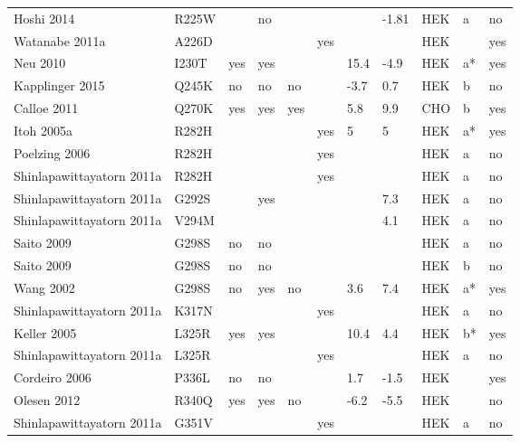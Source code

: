 \begin{tiny}
\begin{longtable}{p{4cm}|l|llll|ll|lll}
Hoshi 2014\cite{Hoshi2014MutationDB} & R225W &  & no &  &  &  & -1.81 & HEK & a & no \\
Watanabe 2011a\cite{Watanabe2011aMutationDB} & A226D &  &  &  & yes &  &  & HEK &  & yes \\
Neu 2010\cite{Neu2010MutationDB} & I230T & yes & yes &  &  & 15.4 & -4.9 & HEK & a* & yes \\
Kapplinger 2015\cite{Kapplinger2015MutationDB} & Q245K & no & no & no &  & -3.7 & 0.7 & HEK & b & no \\
Calloe 2011\cite{Calloe2011MutationDB} & Q270K & yes & yes & yes &  & 5.8 & 9.9 & CHO & b & yes \\
Itoh 2005a\cite{Itoh2005aMutationDB} & R282H &  &  &  & yes & 5 & 5 & HEK & a* & yes \\
Poelzing 2006\cite{Poelzing2006MutationDB} & R282H &  &  &  & yes &  &  & HEK & a & no \\
Shinlapawittayatorn 2011a\cite{Shinlapawittayatorn2011aMutationDB} & R282H &  &  &  & yes &  &  & HEK & a & no \\
Shinlapawittayatorn 2011a\cite{Shinlapawittayatorn2011aMutationDB} & G292S &  & yes &  &  &  & 7.3 & HEK & a & no \\
Shinlapawittayatorn 2011a\cite{Shinlapawittayatorn2011aMutationDB} & V294M &  &  &  &  &  & 4.1 & HEK & a & no \\
Saito 2009\cite{Saito2009MutationDB} & G298S & no & no &  &  &  &  & HEK & a & no \\
Saito 2009\cite{Saito2009MutationDB} & G298S & no & no &  &  &  &  & HEK & b & no \\
Wang 2002\cite{Wang2002MutationDB} & G298S & no & yes & no &  & 3.6 & 7.4 & HEK & a* & yes \\
Shinlapawittayatorn 2011a\cite{Shinlapawittayatorn2011aMutationDB} & K317N &  &  &  & yes &  &  & HEK & a & no \\
Keller 2005\cite{Keller2005MutationDB} & L325R & yes & yes &  &  & 10.4 & 4.4 & HEK & b* & yes \\
Shinlapawittayatorn 2011a\cite{Shinlapawittayatorn2011aMutationDB} & L325R &  &  &  & yes &  &  & HEK & a & no \\
Cordeiro 2006\cite{Cordeiro2006MutationDB} & P336L & no & no &  &  & 1.7 & -1.5 & HEK &  & yes \\
Olesen 2012\cite{Olesen2012MutationDB} & R340Q & yes & yes & no &  & -6.2 & -5.5 & HEK &  & no \\
Shinlapawittayatorn 2011a\cite{Shinlapawittayatorn2011aMutationDB} & G351V &  &  &  & yes &  &  & HEK & a & no \\

\end{longtable}
\end{tiny}
